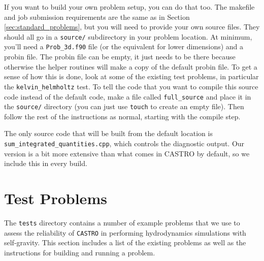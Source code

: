 \documentclass[12pt]{book}
\begin{document}
If you want to build your own problem setup, you can do that too. The makefile and job submission 
requirements are the same as in Section \ref{sec:standard_problems}, but you will need to provide 
your own source files. They should all go in a \texttt{source/} subdirectory in your problem location.
At minimum, you'll need a \texttt{Prob\_3d.f90} file (or the equivalent for lower dimensions) and a 
probin file. The probin file can be empty, it just needs to be there because otherwise the helper 
routines will make a copy of the default probin file. To get a sense of how this is done, look at 
some of the existing test problems, in particular the \texttt{kelvin\_helmholtz} test. To tell the 
code that you want to compile this source code instead of the default code, make a file called 
\texttt{full\_source} and place it in the \texttt{source/} directory (you can just use \texttt{touch}
to create an empty file). Then follow the rest of the instructions as normal, starting with the 
compile step.

The only source code that will be built from the default location is \texttt{sum\_integrated\_quantities.cpp},
which controls the diagnostic output. Our version is a bit more extensive than what comes in CASTRO
by default, so we include this in every build.

\chapter{Test Problems}

The \texttt{tests} directory contains a number of example problems that we use
to assess the reliability of \texttt{CASTRO} in performing hydrodynamics simulations 
with self-gravity. This section includes a list of the existing problems 
as well as the instructions for building and running a problem.
\end{document}
